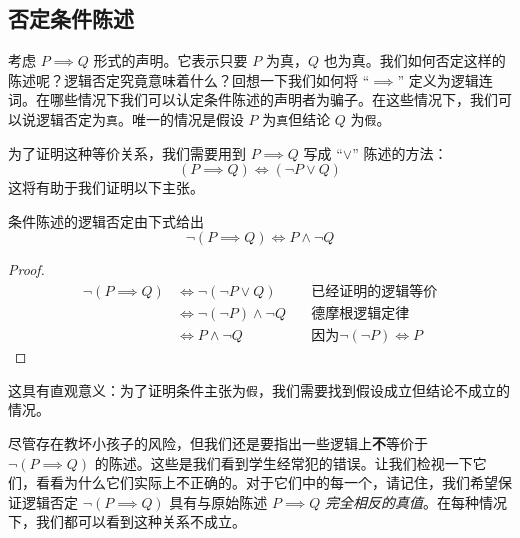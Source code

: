 \subsection{否定条件陈述}

考虑 $P \implies Q$ 形式的声明。它表示只要 $P$ 为真，$Q$ 也为真。我们如何否定这样的陈述呢？逻辑否定究竟意味着什么？回想一下我们如何将 ``$\implies$'' 定义为逻辑连词。在哪些情况下我们可以认定条件陈述的声明者为骗子。在这些情况下，我们可以说逻辑否定为\verb|真|。唯一的情况是假设 $P$ 为\verb|真|但结论 $Q$ 为\verb|假|。

为了证明这种等价关系，我们需要用到 $P \implies Q$ 写成 ``$\lor$'' 陈述的方法：
\[(P \implies Q) \iff (\neg P \lor Q)\]
这将有助于我们证明以下主张。

\begin{lemma}
    条件陈述的逻辑否定由下式给出
    \[\neg (P \implies Q) \iff P \land \neg Q\]
\end{lemma}

\begin{proof}
    \begin{align*}
        \neg (P \implies Q) &\iff \neg (\neg P \lor Q) &\quad \text{已经证明的逻辑等价} \\
        &\iff \neg (\neg P) \land \neg Q &\quad \text{德摩根逻辑定律} \\
        &\iff P \land \neg Q &\quad \text{因为} \neg (\neg P) \iff P
    \end{align*}
\end{proof}

这具有直观意义：为了证明条件主张为\verb|假|，我们需要找到假设成立但结论不成立的情况。

尽管存在教坏小孩子的风险，但我们还是要指出一些逻辑上\textbf{不}等价于 $\neg (P \implies Q)$ 的陈述。这些是我们看到学生经常犯的错误。让我们检视一下它们，看看为什么它们实际上不正确的。对于它们中的每一个，请记住，我们希望保证逻辑否定 $\neg (P \implies Q)$ 具有与原始陈述 $P \implies Q$ \emph{完全相反的真值}。在每种情况下，我们都可以看到这种关系不成立。

